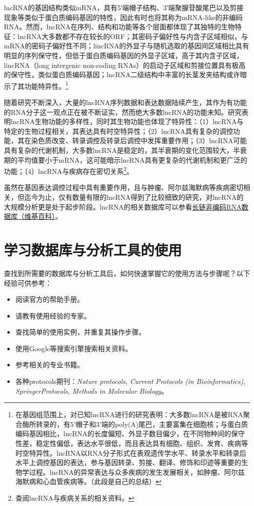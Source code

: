 \documentclass[11pt,a4paper,twoside]{book}
\begin{document}
lncRNA的基因结构类似mRNA，具有5′端帽子结构、3′端聚腺苷酸尾巴以及剪接现象等类似于蛋白质编码基因的特性，因此有时也将其称为mRNA-like的非编码RNA。然而，lncRNA在序列、结构和功能等各个层面都体现了其独特的生物特征：lncRNA大多数都不存在较长的ORF；其密码子偏好性与内含子区域相似，与mRNA的密码子偏好性不同；lincRNA的外显子与随机选取的基因间区域相比具有明显的序列保守性，但低于蛋白质编码基因的外显子区域，高于其内含子区域，lincRNA（long intergenic non-coding RNAs）的启动子区域和剪接位置具有极高的保守性，类似蛋白质编码基因；lncRNA二级结构中丰富的长茎发夹结构或许暗示了其功能特异性。\footnote{在基因组范围上，对已知lncRNA进行的研究表明：大多数lncRNA是被RNA聚合酶所转录的，有5'帽子和3'端的poly(A)尾巴，主要富集在细胞核；与蛋白质编码基因相比，lncRNA的长度偏短、外显子数目偏少，在不同物种间的保守性差，稳定性偏低，表达水平很低，而且表达具有细胞、组织、发育、疾病等时空特异性。lncRNA以RNA分子形式在表观遗传学水平、转录水平和转录后水平上调控基因的表达，参与基因转录、剪接、翻译、修饰和印迹等重要的生物学过程。lncRNA的异常表达与众多疾病的发生发展相关，如肿瘤、阿尔兹海默病和心血管疾病等。（此段是自己的总结）}

随着研究不断深入，大量的lncRNA序列数据和表达数据陆续产生，其作为有功能的RNA分子这一观点正在被不断证实，然而绝大多数lncRNA的功能未知。研究表明lncRNA生物功能的多样性，同时其生物功能也体现了特异性：（1）lncRNA与特定的生物过程相关，其表达具有时空特异性；（2）lncRNA具有复杂的调控功能，其在染色质改变、转录调控及转录后调控中发挥重要作用；（3）lncRNA可能具有复杂的代谢机制，大多数lncRNA是稳定的，其半衰期的变化范围较大，半衰期的平均值要小于mRNA，这可能暗示lncRNA具有更复杂的代谢机制和更广泛的功能；（4）lncRNA与疾病存在密切关系\footnote{查阅lncRNA与疾病关系的相关资料。}。

虽然在基因表达调控过程中具有重要作用，且与肿瘤、阿尔兹海默病等疾病密切相关，但迄今为止，仅有数量有限的lncRNA得到了比较细致的研究，对lncRNA的大规模分析更是处于起步阶段。lncRNA的相关数据库可以参看\href{http://zh.wikipedia.org/wiki/\%E9\%95\%BF\%E9\%93\%BE\%E9\%9D\%9E\%E7\%BC\%96\%E7\%A0\%81RNA\%E6\%95\%B0\%E6\%8D\%AE\%E5\%BA\%93}{长链非编码RNA数据库（维基百科）}。

\section{学习数据库与分析工具的使用}
查找到所需要的数据库与分析工具后，如何快速掌握它的使用方法与步骤呢？以下经验可供参考：
\begin{itemize}
  \item 阅读官方的帮助手册。
  \item 请教有使用经验的专家。
  \item 查找简单的使用实例，并重复其操作步骤。
  \item 使用Google等搜索引擎搜索相关资料。
  \item 参考相关的专业书籍。
  \item 各种protocols期刊：\textit{Nature protocols, Current Protocols (in Bioinformatics), SpringerProtocols, Methods in Molecular Biology}。
\end{itemize}
\end{document}
